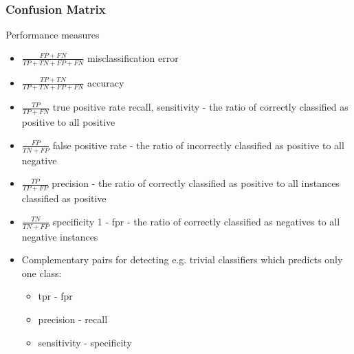 \documentclass[smaller, proffesionalfonts]{beamer}
\begin{document}
\begin{frame}
\frametitle{Confusion Matrix}
\begin{block}{Performance measures}
\begin{itemize}
\item
$\frac{FP+FN}{TP+TN+FP+FN}$
misclassification error
\item
$\frac{TP+TN}{TP+TN+FP+FN}$
accuracy
\item
$\frac{TP}{TP+FN}$
true positive rate {recall, sensitivity} -
the ratio of correctly classified as positive to all positive
\item
$\frac{FP}{TN+FP}$
false positive rate -
the ratio of incorrectly classified as positive to all negative
\item
$\frac{TP}{TP+FP}$
precision -
the ratio of correctly classified as positive to all instances classified as positive 
\item
$\frac{TN}{TN+FP}$
specificity {1 - fpr} -
the ratio of correctly classified as negatives to all negative instances 
\item
Complementary pairs for detecting e.g. trivial classifiers which predicts only one class:
\begin{itemize}
\item
tpr - fpr
\item
precision - recall
\item
sensitivity - specificity
\end{itemize}
\end{itemize}
\end{block}
\end{frame}
\end{document}
